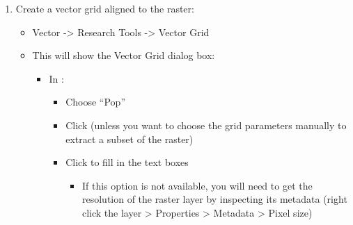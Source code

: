 \documentclass[letterpaper,10pt,english]{sphinxmanual}
\begin{document}
\begin{figure}[htbp]
\centering
\capstart

\noindent{}
\caption{}\label{\detokenize{OtherManuals/LQF_Manual:id6}}\end{figure}
\begin{enumerate}
\item {} 
Create a vector grid aligned to the raster:
\begin{itemize}
\item {} 
Vector -\textgreater{} Research Tools -\textgreater{} Vector Grid

\begin{figure}[htbp]
\centering
\capstart

\noindent{}
\caption{}\label{\detokenize{OtherManuals/LQF_Manual:id7}}\end{figure}

\item {} 
This will show the Vector Grid dialog box:

\begin{figure}[htbp]
\centering
\capstart

\noindent{}
\caption{}\label{\detokenize{OtherManuals/LQF_Manual:id8}}\end{figure}
\begin{itemize}
\item {} 
In :
\begin{itemize}
\item {} 
Choose “Pop”

\item {} 
Click  (unless you want to choose the grid parameters
manually to extract a subset of the raster)

\item {} 
Click  to fill in the text boxes
\begin{itemize}
\item {} 
If this option is not available, you will need to get the
resolution of the raster layer by inspecting its metadata
(right click the layer \textgreater{} Properties \textgreater{} Metadata \textgreater{} Pixel
size)

\end{itemize}


\end{itemize}
\end{itemize}
\end{itemize}
\end{enumerate}
\end{document}
